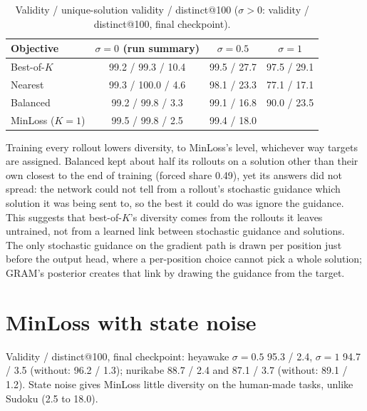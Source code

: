 \documentclass[11pt]{article}
\newcommand{\bok}{best-of-$K$}
\newcommand{\Bok}{Best-of-$K$}
\begin{document}
\begin{table}[h]
\centering\small
\begin{tabular}{@{}lccc@{}}
\toprule
Objective & $\sigma=0$ (run summary) & $\sigma=0.5$ & $\sigma=1$ \\
\midrule
\Bok{} & 99.2 / 99.3 / 10.4 & 99.5 / 27.7 & 97.5 / 29.1 \\
Nearest & 99.3 / 100.0 / 4.6 & 98.1 / 23.3 & 77.1 / 17.1 \\
Balanced & 99.2 / 99.8 / 3.3 & 99.1 / 16.8 & 90.0 / 23.5 \\
MinLoss ($K=1$) & 99.5 / 99.8 / 2.5 & 99.4 / 18.0 & \\
\bottomrule
\end{tabular}
\caption{Validity / unique-solution validity / distinct@100 ($\sigma>0$: validity / distinct@100, final checkpoint).}
\end{table}

Training every rollout lowers diversity, to MinLoss's level, whichever way targets are assigned. Balanced kept about
half its rollouts on a solution other than their own closest to the end of training (forced share 0.49), yet its
answers did not spread: the network could not tell from a rollout's stochastic guidance which solution it was being
sent to, so the best it could do was ignore the guidance. This suggests that \bok{}'s diversity comes from the
rollouts it leaves untrained, not from a learned link between stochastic guidance and solutions. The only
stochastic guidance on the gradient path is drawn per position just before the output head, where a per-position
choice cannot pick a whole solution; GRAM's posterior creates that link by drawing the guidance from the target.

\section{MinLoss with state noise}

Validity / distinct@100, final checkpoint: heyawake $\sigma=0.5$ 95.3 / 2.4, $\sigma=1$ 94.7 / 3.5 (without: 96.2 /
1.3); nurikabe 88.7 / 2.4 and 87.1 / 3.7 (without: 89.1 / 1.2). State noise gives MinLoss little diversity on the
human-made tasks, unlike Sudoku (2.5 to 18.0).
\end{document}
